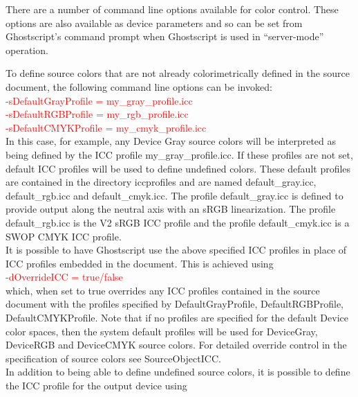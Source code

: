 \documentclass[12pt,notitlepage]{article}
\begin{document}
There are a number of command line options available for color control.  These options are also available as device parameters and so can be set from Ghostscript's command prompt when Ghostscript is used in ``server-mode'' operation.

To define source colors that are not already colorimetrically defined in the source document, the following command line options can be invoked:\\

\textcolor{red}{-sDefaultGrayProfile = my\_gray\_profile.icc}\\

\textcolor{red}{-sDefaultRGBProfile = my\_rgb\_profile.icc}\\

\textcolor{red}{-sDefaultCMYKProfile = my\_cmyk\_profile.icc}\\

 \noindent In this case, for example, any Device Gray source colors will be interpreted as being defined by the ICC profile my\_gray\_profile.icc.  If these profiles are not set, default ICC profiles will be used to define undefined colors.  These default profiles are contained in the directory iccprofiles and are named default\_gray.icc, default\_rgb.icc and default\_cmyk.icc.  The profile default\_gray.icc is defined to provide output along the neutral axis with an sRGB linearization.  The profile default\_rgb.icc is the V2 sRGB ICC profile and the profile default\_cmyk.icc is a SWOP CMYK ICC profile.\\

It is possible to have Ghostscript use the above specified ICC profiles in place of ICC profiles embedded in the document.  This is achieved using\\

 \textcolor{red}{-dOverrideICC = true/false}\\

\noindent which, when set to true overrides any ICC profiles contained in the source document with the profiles specified by DefaultGrayProfile, DefaultRGBProfile, DefaultCMYKProfile. Note that if no profiles are specified for the default Device color spaces, then the system default profiles will be used for DeviceGray, DeviceRGB and DeviceCMYK source colors. For detailed override control in the specification of source colors see SourceObjectICC.\\

In addition to being able to define undefined source colors, it is possible to define the ICC profile for the output device using\\
\end{document}
